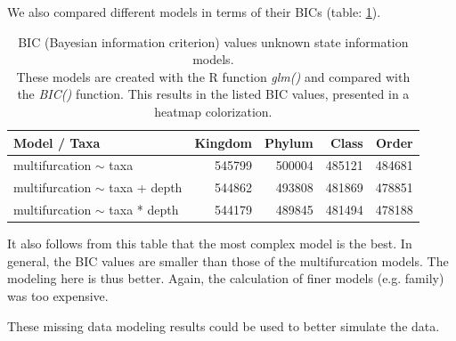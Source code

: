       We also compared different models in terms of their BICs (table: \ref{table:BIC unknown information}). \\ 
      \begin{table}[h!]
        \begin{center}
          \begin{tabular}{ |l|r|r|r|r| }
            \hline
            \bfseries Model / Taxa & \bfseries Kingdom & \bfseries Phylum & \bfseries Class & \bfseries Order \\
            \hline \hline
            multifurcation $\sim$ taxa & \cellcolor{green!15}545799 & \cellcolor{green!35}500004 & \cellcolor{green!45}485121 & \cellcolor{green!45}484681 \\
            \hline
            multifurcation $\sim$ taxa + depth & \cellcolor{green!15}544862 & \cellcolor{green!40}493808 & \cellcolor{green!45}481869 & \cellcolor{green!50}478851 \\
            \hline
            multifurcation $\sim$ taxa * depth & \cellcolor{green!15}544179 & \cellcolor{green!45}489845 & \cellcolor{green!45}481494 & \cellcolor{green!50}478188 \\
            \hline
          \end{tabular} 
        \end{center}
        \caption{BIC (Bayesian information criterion) values unknown state information models. \\
          These models are created with the R function \textit{glm()} and compared with the 
            \textit{BIC()} function. This results in the listed BIC values, presented in a heatmap colorization.}
        \label{table:BIC unknown information} 
      \end{table}

      It also follows from this table that the most complex model is the best. In general, the BIC 
        values are smaller than those of the multifurcation models. The modeling here is thus better.
      Again, the calculation of finer models (e.g. family) was too expensive.

      These missing data modeling results could be used to better simulate the data. \\

\newpage

